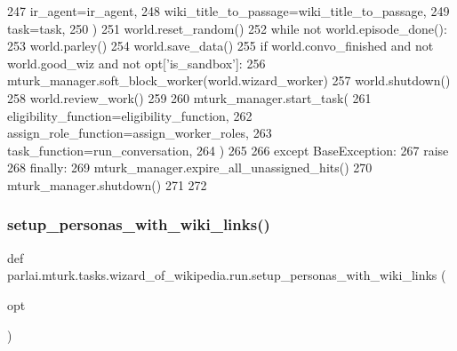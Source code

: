 \begin{DoxyCode}
247                 ir\_agent=ir\_agent,
248                 wiki\_title\_to\_passage=wiki\_title\_to\_passage,
249                 task=task,
250             )
251             world.reset\_random()
252             \textcolor{keywordflow}{while} \textcolor{keywordflow}{not} world.episode\_done():
253                 world.parley()
254             world.save\_data()
255             \textcolor{keywordflow}{if} world.convo\_finished \textcolor{keywordflow}{and} \textcolor{keywordflow}{not} world.good\_wiz \textcolor{keywordflow}{and} \textcolor{keywordflow}{not} opt[\textcolor{stringliteral}{'is\_sandbox'}]:
256                 mturk\_manager.soft\_block\_worker(world.wizard\_worker)
257             world.shutdown()
258             world.review\_work()
259 
260         mturk\_manager.start\_task(
261             eligibility\_function=eligibility\_function,
262             assign\_role\_function=assign\_worker\_roles,
263             task\_function=run\_conversation,
264         )
265 
266     \textcolor{keywordflow}{except} BaseException:
267         \textcolor{keywordflow}{raise}
268     \textcolor{keywordflow}{finally}:
269         mturk\_manager.expire\_all\_unassigned\_hits()
270         mturk\_manager.shutdown()
271 
272 
\end{DoxyCode}
\mbox{\label{namespaceparlai_1_1mturk_1_1tasks_1_1wizard__of__wikipedia_1_1run_a5c16caa932230f93c418facd793be473}} 
\subsubsection{\texorpdfstring{setup\+\_\+personas\+\_\+with\+\_\+wiki\+\_\+links()}{setup\_personas\_with\_wiki\_links()}}
{\footnotesize\ttfamily def parlai.\+mturk.\+tasks.\+wizard\+\_\+of\+\_\+wikipedia.\+run.\+setup\+\_\+personas\+\_\+with\+\_\+wiki\+\_\+links (\begin{DoxyParamCaption}\item[{}]{opt }\end{DoxyParamCaption})}



